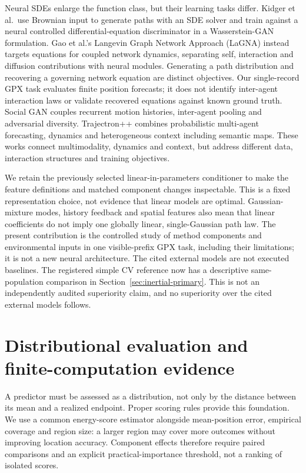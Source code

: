 Neural SDEs enlarge the function class, but their learning tasks differ.
Kidger et al.\ use Brownian input to generate paths with an SDE solver and
train against a neural controlled differential-equation discriminator in
a Wasserstein-GAN formulation\cite{kidger2021}. Gao et al.'s Langevin Graph
Network Approach (LaGNA) instead targets equations for coupled network
dynamics, separating self, interaction and diffusion contributions with
neural modules\cite{gao2024}. Generating a path distribution and recovering
a governing network equation are distinct objectives. Our single-record
GPX task evaluates finite position forecasts; it does not identify
inter-agent interaction laws or validate recovered equations against known
ground truth. Social GAN couples recurrent motion histories,
inter-agent pooling and adversarial diversity\cite{gupta2018}.
Trajectron++ combines probabilistic multi-agent forecasting, dynamics and
heterogeneous context including semantic maps\cite{salzmann2020}.
These works connect multimodality, dynamics and context, but address
different data, interaction structures and training objectives.

We retain the previously selected linear-in-parameters conditioner to make
the feature definitions and matched component changes inspectable.
This is a fixed representation choice, not evidence that linear models
are optimal. Gaussian-mixture modes, history feedback and spatial features
also mean that linear coefficients do not imply one globally linear,
single-Gaussian path law. The present contribution is the controlled study
of method components and environmental inputs in one visible-prefix GPX
task, including their limitations; it is not a new neural architecture.
The cited external models are not executed baselines. The registered simple
CV reference now has a descriptive same-population comparison in
Section~\ref{sec:inertial-primary}. This is not an independently audited
superiority claim, and no superiority over the cited external models follows.


\section{Distributional evaluation and finite-computation evidence}
A predictor must be assessed as a distribution, not only by the distance
between its mean and a realized endpoint. Proper scoring rules provide
this foundation\cite{gneiting2007,gneiting2008}. We use a common energy-score
estimator alongside mean-position error, empirical coverage and region
size: a larger region may cover more outcomes without improving location
accuracy. Component effects therefore require paired comparisons and an
explicit practical-importance threshold, not a ranking of isolated scores.

